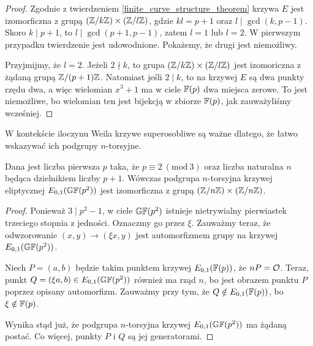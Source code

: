 \begin{proof}
Zgodnie z twierdzeniem \ref{finite_curve_structure_theorem}
krzywa $E$ jest izomorficzna z grupą $(\mathbb{Z} / k\mathbb{Z}) \times (\mathbb{Z} / l\mathbb{Z})$,
gdzie $kl = p+1$ oraz $l \mid \gcd(k, p-1)$.
Skoro $k \mid p+1$, to $l \mid \gcd(p+1, p-1)$,
zatem $l = 1$ lub $l = 2$.
W pierwszym przypadku twierdzenie jest udowodnione.
Pokażemy, że drugi jest niemożliwy.

\noindent
Przyjmijmy, że $l = 2$.
Jeżeli $2 \nmid k$,
to grupa $(\mathbb{Z} / k\mathbb{Z}) \times (\mathbb{Z} / l\mathbb{Z})$ jest izomoriczna
z żądaną grupą $\mathbb{Z} / (p+1)\mathbb{Z}$.
Natomiast jeśli $2 \mid k$, to na krzywej $E$ są dwa punkty rzędu dwa,
a więc wielomian $x^3 + 1$ ma w ciele $\mathbb{F}(p)$ dwa miejsca zerowe.
To jest niemożliwe, bo wielomian ten jest bijekcją w zbiorze $\mathbb{F}(p)$,
jak zauważyliśmy wcześniej.
\end{proof}

\noindent
W kontekście iloczynu Weila krzywe superosobliwe są ważne dlatego,
że łatwo wskazywać ich podgrupy $n$-torsyjne.

\begin{theorem}
Dana jest liczba pierwsza $p$ taka, że $p \equiv 2\ (\mathrm{mod}\ 3)$
oraz liczba naturalna $n$ będąca dzielnikiem liczby $p + 1$.
Wówczas podgrupa $n$-torsyjna krzywej eliptycznej $E_{0,1}(\mathbb{GF}(p^2))$
jest izomorficzna z grupą $(\mathbb{Z} / n\mathbb{Z}) \times (\mathbb{Z} / n\mathbb{Z})$.
\end{theorem}

\begin{proof}
Ponieważ $3 \mid p^2-1$, w ciele $\mathbb{GF}(p^2)$
istnieje nietrywialny pierwiastek trzeciego stopnia z jedności.
Oznaczmy go przez $\xi$.
Zauważmy teraz, że odwzorowanie $(x, y) \to (\xi x, y)$
jest automorfizmem grupy na krzywej $E_{0,1}(\mathbb{GF}(p^2))$.

\noindent
Niech $P = (a, b)$ będzie takim punktem krzywej $E_{0,1}(\mathbb{F}(p))$,
że $nP = \mathcal{O}$.
Teraz, punkt $Q = (\xi a, b) \in E_{0,1}(\mathbb{GF}(p^2))$ również ma rząd $n$,
bo jest obrazem punktu $P$ poprzez opisany automorfizm.
Zauważmy przy tym, że $Q \notin E_{0,1}(\mathbb{F}(p))$,
bo $\xi \notin \mathbb{F}(p)$.

\noindent
Wynika stąd już, że podgrupa $n$-torsyjna krzywej $E_{0,1}(\mathbb{GF}(p^2))$
ma żądaną postać. Co więcej, punkty $P$ i $Q$ są jej generatorami.
\end{proof}
